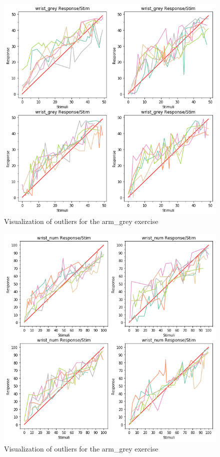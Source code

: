 \begin{figure}[h!]
\centering
\includegraphics[width=1.1\textwidth]{figures/visual_out3.png}
\caption{Visualization of outliers for the arm\_grey exercise}
\label{NAN}
\end{figure}

\begin{figure}[h!]
\centering
\includegraphics[width=1.1\textwidth]{figures/visual_out4.png}
\caption{Visualization of outliers for the arm\_grey exercise}
\label{NAN}
\end{figure}

